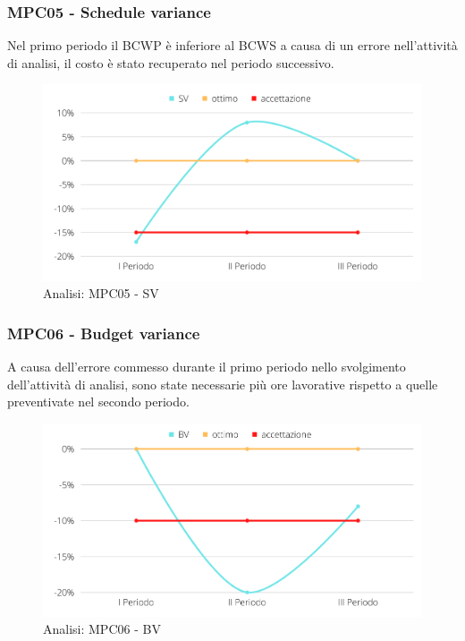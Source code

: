 \subsubsection{MPC05 - Schedule variance}
Nel primo periodo il BCWP è inferiore al BCWS a causa di un errore nell'attività di analisi, il costo è stato recuperato nel periodo successivo.
\begin{figure}[H]
    \centering
    \includegraphics[scale=0.50]{Sezioni/images/analisi-SV.png}
    \caption{Analisi: MPC05 - SV}
\end{figure}

\subsubsection{MPC06 - Budget variance}
A causa dell'errore commesso durante il primo periodo nello svolgimento dell'attività di analisi, sono state necessarie più ore lavorative rispetto a quelle preventivate nel secondo periodo.
\begin{figure}[H]
    \centering
    \includegraphics[scale=0.50]{Sezioni/images/analisi-BV.png}
    \caption{Analisi: MPC06 - BV}
\end{figure}

